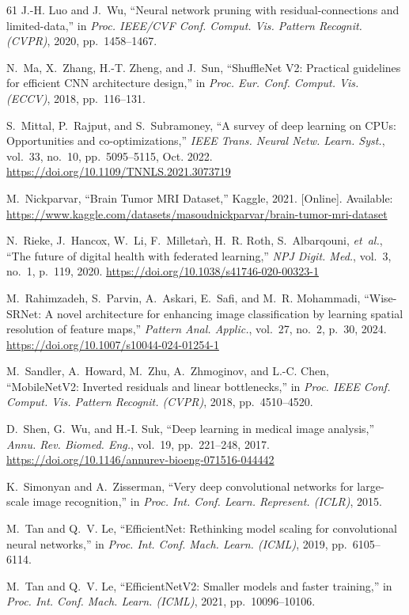 ﻿\documentclass[journal]{IEEEtran}
\providecommand{\doi}[1]{\url{https://doi.org/#1}}
\begin{document}
\begin{thebibliography}{61}
J.-H. Luo and J.~Wu, ``Neural network pruning with residual-connections and limited-data,'' in \emph{Proc. IEEE/CVF Conf. Comput. Vis. Pattern Recognit. (CVPR)}, 2020, pp.~1458--1467.

N.~Ma, X.~Zhang, H.-T. Zheng, and J.~Sun, ``ShuffleNet V2: Practical guidelines for efficient CNN architecture design,'' in \emph{Proc. Eur. Conf. Comput. Vis. (ECCV)}, 2018, pp.~116--131.

S.~Mittal, P.~Rajput, and S.~Subramoney, ``A survey of deep learning on CPUs: Opportunities and co-optimizations,'' \emph{IEEE Trans. Neural Netw. Learn. Syst.}, vol.~33, no.~10, pp.~5095--5115, Oct. 2022. \doi{10.1109/TNNLS.2021.3073719}

M.~Nickparvar, ``Brain Tumor MRI Dataset,'' Kaggle, 2021. [Online]. Available: \url{https://www.kaggle.com/datasets/masoudnickparvar/brain-tumor-mri-dataset}

N.~Rieke, J.~Hancox, W.~Li, F.~Milletar{\`\i}, H.~R. Roth, S.~Albarqouni, \emph{et~al.}, ``The future of digital health with federated learning,'' \emph{NPJ Digit. Med.}, vol.~3, no.~1, p.~119, 2020. \doi{10.1038/s41746-020-00323-1}

M.~Rahimzadeh, S.~Parvin, A.~Askari, E.~Safi, and M.~R. Mohammadi, ``Wise-SRNet: A novel architecture for enhancing image classification by learning spatial resolution of feature maps,'' \emph{Pattern Anal. Applic.}, vol.~27, no.~2, p.~30, 2024. \doi{10.1007/s10044-024-01254-1}

M.~Sandler, A.~Howard, M.~Zhu, A.~Zhmoginov, and L.-C. Chen, ``MobileNetV2: Inverted residuals and linear bottlenecks,'' in \emph{Proc. IEEE Conf. Comput. Vis. Pattern Recognit. (CVPR)}, 2018, pp.~4510--4520.

D.~Shen, G.~Wu, and H.-I. Suk, ``Deep learning in medical image analysis,'' \emph{Annu. Rev. Biomed. Eng.}, vol.~19, pp.~221--248, 2017. \doi{10.1146/annurev-bioeng-071516-044442}

K.~Simonyan and A.~Zisserman, ``Very deep convolutional networks for large-scale image recognition,'' in \emph{Proc. Int. Conf. Learn. Represent. (ICLR)}, 2015.

M.~Tan and Q.~V. Le, ``EfficientNet: Rethinking model scaling for convolutional neural networks,'' in \emph{Proc. Int. Conf. Mach. Learn. (ICML)}, 2019, pp.~6105--6114.

M.~Tan and Q.~V. Le, ``EfficientNetV2: Smaller models and faster training,'' in \emph{Proc. Int. Conf. Mach. Learn. (ICML)}, 2021, pp.~10096--10106.


\end{thebibliography}
\end{document}
